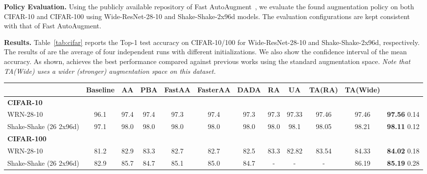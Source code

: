 \textbf{Policy Evaluation.} 
Using the publicly available repository of Fast AutoAugment~\citep{lim2019fast}, we evaluate the found augmentation policy on both CIFAR-10 and CIFAR-100 using Wide-ResNet-28-10 and Shake-Shake-2x96d models. The evaluation configurations are kept consistent with that of Fast AutoAugment.

\textbf{Results.} 
Table~\ref{tab:cifar} reports the Top-1 test accuracy on CIFAR-10/100 for Wide-ResNet-28-10 and Shake-Shake-2x96d, respectively. The results of \DAA{} are the average of four independent runs with different initializations. We also show the  confidence interval of the mean accuracy. As shown, \DAA{} achieves the best performance compared against previous works using the standard augmentation space. \emph{
Note that TA(Wide) uses a wider (stronger) augmentation space on this dataset.}

\begin{table*}[h]
\centering
\resizebox{1.0\textwidth}{!}
{
\begin{tabular}{@{}l|c|c|c|c|c|c|c|c|c|c|c@{}}
\toprule
\multicolumn{1}{l}{\textbf{}} & \multicolumn{1}{c}{\textbf{Baseline}} & \multicolumn{1}{c}{\textbf{AA}} &
\multicolumn{1}{c}{\textbf{PBA}} &
\multicolumn{1}{c}{\textbf{FastAA}} &
\multicolumn{1}{c}{\textbf{FasterAA}} &
\multicolumn{1}{c}{\textbf{DADA}} &
\multicolumn{1}{c}{\textbf{RA}} &
\multicolumn{1}{c}{\textbf{UA}} &
\multicolumn{1}{c}{\textbf{TA(RA)}} &
\multicolumn{1}{c}{\textbf{TA(Wide) \footnotemark}} &
\multicolumn{1}{c}{\textbf{\DAA{}}}
\\ 
\midrule
\textbf{CIFAR-10} & & & & & & & & & & & \\
WRN-28-10 & 96.1 & 97.4 & 97.4 & 97.3 & 97.4 & 97.3 & 97.3 & 97.33 & 97.46 & 97.46  & \textbf{97.56}  0.14 \\
Shake-Shake \footnotesize{(26 2x96d)} & 97.1 & 98.0 & 98.0 & 98.0 & 98.0 & 98.0 & 98.0 & 98.1 & 98.05 & 98.21 & \textbf{98.11}  0.12 \\
\midrule
\textbf{CIFAR-100} & & & & & & & & & & \\
WRN-28-10 & 81.2 & 82.9 & 83.3 & 82.7 & 82.7 & 82.5 & 83.3 & 82.82 & 83.54 & 84.33 & \textbf{84.02}  0.18 \\
Shake-Shake \footnotesize{(26 2x96d)} & 82.9 & 85.7 & 84.7 & 85.1 & 85.0 & 84.7 & - & - & - & 86.19 & \textbf{85.19}  0.28 \\
\bottomrule
\end{tabular}
}
\caption{{\small Top-1 test accuracy on CIFAR-10/100 for Wide-ResNet-28-10 and Shake-Shake-2x96d. The results of \DAA{} are averaged over four independent runs with different initializations. The  confidence interval is denoted by .}}
\label{tab:cifar}
\end{table*}



